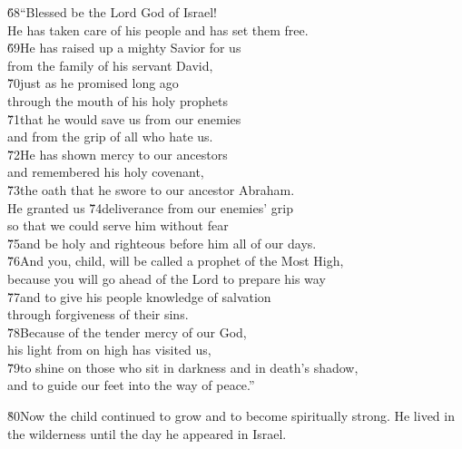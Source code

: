 \begin{poetry}
\poeml \v{68}``Blessed be the Lord God of Israel! \\
\poemll    He has taken care of his people and has set them free. \\
\poeml \v{69}He has raised up a mighty Savior for us \\
\poemll    from the family of his servant David, \\
\poeml \v{70}just as he promised long ago \\
\poeml through the mouth of his holy prophets \\
\poeml \v{71}that he would save us from our enemies \\
\poemll    and from the grip of all who hate us. \\
\poeml \v{72}He has shown mercy to our ancestors \\
\poemll    and remembered his holy covenant, \\
\poeml \v{73}the oath that he swore to our ancestor Abraham. \\
\poeml He granted us \v{74}deliverance from our enemies' grip \\
\poemll    so that we could serve him without fear \\
\poeml \v{75}and be holy and righteous before him all of our days. \\
\poeml \v{76}And you, child, will be called a prophet of the Most High, \\
\poemll    because you will go ahead of the Lord to prepare his way \\
\poeml \v{77}and to give his people knowledge of salvation \\
\poemll    through forgiveness of their sins. \\
\poeml \v{78}Because of the tender mercy of our God, \\
\poemll    his light from on high has visited us, \\
\poeml \v{79}to shine on those who sit in darkness and in death's shadow, \\
\poemll    and to guide our feet into the way of peace.''
\end{poetry}

\v{80}Now the child continued to grow and to become spiritually strong. He lived in the wilderness until the day he appeared in Israel.

